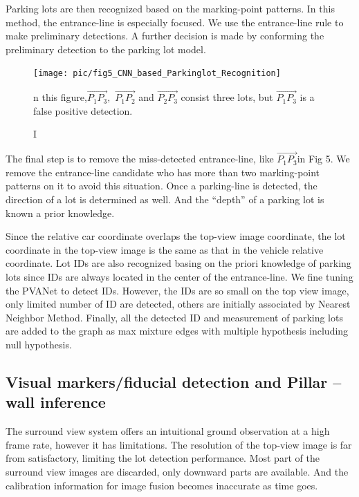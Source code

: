 \documentclass[journal]{IEEEtran}
\begin{document}
Parking lots are then recognized based on the marking-point patterns. 
In this method, the entrance-line is especially focused. 
We use the entrance-line rule to make preliminary detections. 
A further decision is made by conforming the preliminary detection to the parking lot model.

\begin{figure}
\centering
\texttt{[image: pic/fig5\_CNN\_based\_Parkinglot\_Recognition]}
\caption
    In this figure,$\overrightarrow{{P}_{1}{P}_{3}},$ $\overrightarrow{{P}_{1}{P}_{2}}$ and $\overrightarrow{{P}_{2}{P}_{3}}$ consist three lots, but $\overrightarrow{{P}_{1}{P}_{3}}$ is a false positive detection.\citep{Li2017Vision}
\label{fig:5}
\end{figure}


The final step is to remove the miss-detected entrance-line, like $\overrightarrow{{P}_{1}{P}_{3}}$in Fig 5. 
We remove the entrance-line candidate who has more than two marking-point patterns on it to avoid this situation.  
Once a parking-line is detected, the direction of a lot is determined as well. And the “depth” of a parking lot is known a prior knowledge. 
	
Since the relative car coordinate overlaps the top-view image coordinate, the lot coordinate in the top-view image is the same as that in the vehicle relative coordinate. 
Lot IDs are also recognized basing on the priori knowledge of parking lots since IDs are always located in the center of the entrance-line. 
We fine tuning the PVANet\cite{Hong2016PVANet} to detect IDs. 
However, the IDs are so small on the top view image, only limited number of ID are detected, others are initially associated by Nearest Neighbor Method. 
Finally, all the detected ID and measurement of parking lots are added to the graph as max mixture \cite{Pfingsthorn2014Representing} edges with multiple hypothesis including null hypothesis.



\subsection{Visual markers/fiducial detection and Pillar – wall inference }

The surround view system offers an intuitional ground observation at a high frame rate, however it has limitations. 
The resolution of the top-view image is far from satisfactory, limiting the lot detection performance. 
Most part of the surround view images are discarded, only downward parts are available. 
And the calibration information for image fusion becomes inaccurate as time goes.
\end{document}
